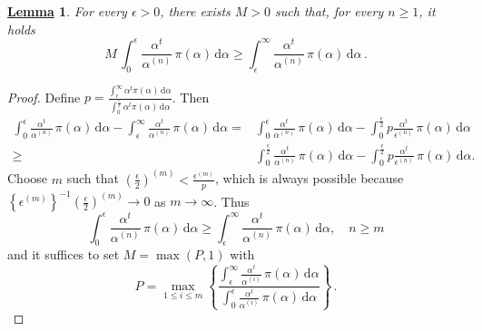 \documentclass[12pt]{article}
\newtheorem{Lem}{\underline{\bf Lemma}}
\begin{document}
\begin{Lem}\label{lower_tech}
For every $\epsilon >0$, there exists $M > 0$ such that, for every $n \geq 1$, it holds
\[
M \,\int_0^\epsilon \frac{\alpha^t}{\alpha^{(n)}}\, \pi(\alpha) \, \mathrm{d}\alpha \geq \int_\epsilon^\infty \frac{\alpha^t}{\alpha^{(n)}}\, \pi(\alpha) \, \mathrm{d}\alpha\,.
\]
\end{Lem}
\begin{proof}
Define $p = \frac{\int_\epsilon^\infty \alpha^t \pi(\alpha) \,\mathrm{d}\alpha}{\int_0^{\frac{\epsilon}{2}} \alpha^t \pi(\alpha) \,\mathrm{d}\alpha}$. Then
\begin{align*}
\int_0^\epsilon \frac{\alpha^t}{\alpha^{(n)}}\, \pi(\alpha) \, \mathrm{d}\alpha - \int_\epsilon^\infty \frac{\alpha^t}{\alpha^{(n)}}\, \pi(\alpha) \, \mathrm{d}\alpha=&
\int_0^{\epsilon} \frac{\alpha^t}{\alpha^{(n)}}\, \pi(\alpha) \, \mathrm{d}\alpha - \int_0^{\frac{\epsilon}{2}} p\frac{\alpha^t}{\epsilon^{(n)}}\, \pi(\alpha) \, \mathrm{d}\alpha\\
\geq& \int_0^{\frac{\epsilon}{2}} \frac{\alpha^t}{\alpha^{(n)}}\, \pi(\alpha) \, \mathrm{d}\alpha - \int_0^{\frac{\epsilon}{2}} p\frac{\alpha^t}{\epsilon^{(n)}}\, \pi(\alpha) \, \mathrm{d}\alpha.
\end{align*}
Choose $m$ such that $\left(\frac{\epsilon}{2}\right)^{(m)} < \frac{\epsilon^{(m)}}{p}$, which is always possible because $\left\{\epsilon^{(m)}\right\}^{-1} \left(\frac{\epsilon}{2}\right)^{(m)}\to 0$ as $m\to\infty$. Thus
\[
\int_0^\epsilon \frac{\alpha^t}{\alpha^{(n)}}\, \pi(\alpha) \, \mathrm{d}\alpha \geq \int_\epsilon^\infty \frac{\alpha^t}{\alpha^{(n)}}\, \pi(\alpha) \, \mathrm{d}\alpha, \quad n \geq m
\]
and it suffices to set $M = \max (P,1)$ with
\[
P = \max_{1 \leq i \leq m} \left\{ \frac{\int_\epsilon^\infty \frac{\alpha^t}{\alpha^{(i)}}\, \pi(\alpha) \, \mathrm{d}\alpha}{\int_0^\epsilon \frac{\alpha^t}{\alpha^{(i)}}\, \pi(\alpha) \, \mathrm{d}\alpha} \right\}\,.
\]
\end{proof}
\end{document}
